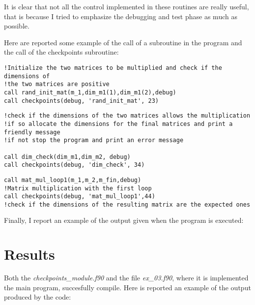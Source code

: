 \documentclass[prb,9pt,notitlepage]{revtex4-1}
\begin{document}
It is clear that not all the control implemented in these routines are really useful, that is because I tried to emphasize the debugging and test phase as much as possible.

Here are reported some example of the call of a subroutine in the program and the call of the checkpoints subroutine:
\begin{lstlisting}
!Initialize the two matrices to be multiplied and check if the dimensions of
!the two matrices are positive
call rand_init_mat(m_1,dim_m1(1),dim_m1(2),debug)
call checkpoints(debug, 'rand_init_mat', 23)
\end{lstlisting}

\begin{lstlisting}
!check if the dimensions of the two matrices allows the multiplication
!if so allocate the dimensions for the final matrices and print a friendly message
!if not stop the program and print an error message

call dim_check(dim_m1,dim_m2, debug)
call checkpoints(debug, 'dim_check', 34)

\end{lstlisting}

\begin{lstlisting}
call mat_mul_loop1(m_1,m_2,m_fin,debug)
!Matrix multiplication with the first loop
call checkpoints(debug, 'mat_mul_loop1',44)
!check if the dimensions of the resulting matrix are the expected ones
\end{lstlisting}

Finally, I report an example of the output given when the program is executed:

\section{Results}
Both the \textit{checkpoints\_module.f90} and the file \textit{ex\_03.f90}, where it is implemented the main program, succesfully compile.
Here is reported an example of the output produced by the code:
\end{document}
